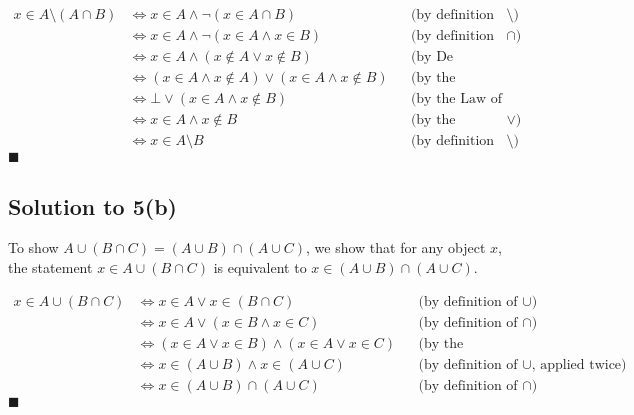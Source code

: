 \documentclass{scrartcl}
\begin{document}
    \begin{align*}
        x \in A \setminus (A \cap B) 
        &\Leftrightarrow x \in A \wedge \neg (x \in A \cap B) 
        && \text{(by definition of $\setminus$)} \\
        &\Leftrightarrow x \in A \wedge \neg (x \in A \wedge x \in B)
        && \text{(by definition of $\cap$)} \\
        &\Leftrightarrow x \in A \wedge (x \notin A \vee x \notin B)
        && \text{(by De Morgan's Law)} \\
        &\Leftrightarrow (x \in A \wedge x \notin A) \vee (x \in A \wedge x \notin B)
        && \text{(by the Distributive Law)} \\
        &\Leftrightarrow \bot \vee (x \in A \wedge x \notin B)
        && \text{(by the Law of Contradiction)} \\
        &\Leftrightarrow x \in A \wedge x \notin B
        && \text{(by the Identity Law for $\vee$)} \\
        &\Leftrightarrow x \in A \setminus B
        && \text{(by definition of $\setminus$)}
    \end{align*}
    \hfill $\blacksquare$


    \subsection*{Solution to 5(b)}
    To show $A \cup (B \cap C) = (A \cup B) \cap (A \cup C)$, we show that for any object $x$, the statement $x \in A \cup (B \cap C)$ is equivalent to $x \in (A \cup B) \cap (A \cup C)$.

    \begin{align*}
        x \in A \cup (B \cap C)
        &\Leftrightarrow x \in A \vee x \in (B \cap C)
        && \text{(by definition of $\cup$)} \\
        &\Leftrightarrow x \in A \vee (x \in B \wedge x \in C)
        && \text{(by definition of $\cap$)} \\
        &\Leftrightarrow (x \in A \vee x \in B) \wedge (x \in A \vee x \in C)
        && \text{(by the Distributive Law)} \\
        &\Leftrightarrow x \in (A \cup B) \wedge x \in (A \cup C)
        && \text{(by definition of $\cup$, applied twice)} \\
        &\Leftrightarrow x \in (A \cup B) \cap (A \cup C)
        && \text{(by definition of $\cap$)}
    \end{align*}
    \hfill $\blacksquare$
\end{document}
